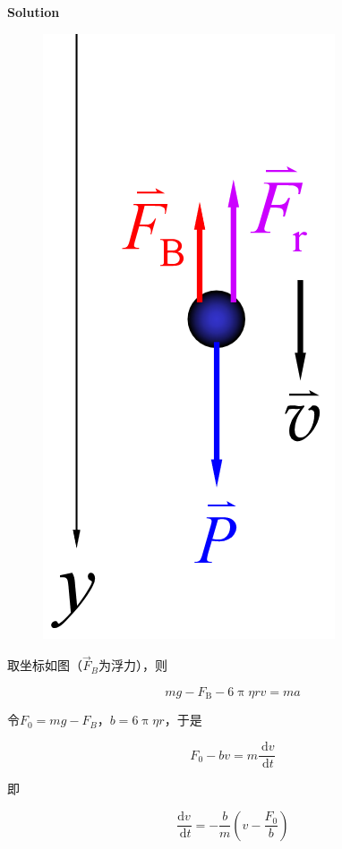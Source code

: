 \documentclass[12pt, a4paper]{article}
\numberwithin{equation}{section}
\begin{document}
    \textbf{Solution}
    \vspace{1em}

    \begin{figure}
        \centering
        \includegraphics[scale=0.3]{"Chapter 02 images/pic2.png"}
        \label{pic2}
    \end{figure}

    取坐标如图（\(\overrightarrow{F}_{B}\)为浮力），则

    $$
        m g-F_{\mathrm{B}}-6 \uppi \eta r v=m a
    $$

    令\(F_{0} = mg - F_{B}\)，\(b = 6 \uppi \eta r\)，于是

    $$
        F_0-b v=m \frac{\mathrm{~d} v}{\mathrm{~d} t}
    $$

    即

    $$
        \frac{\mathrm{d} v}{\mathrm{~d} t}=-\frac{b}{m}\left(v-\frac{F_0}{b}\right)
    $$
\end{document}
